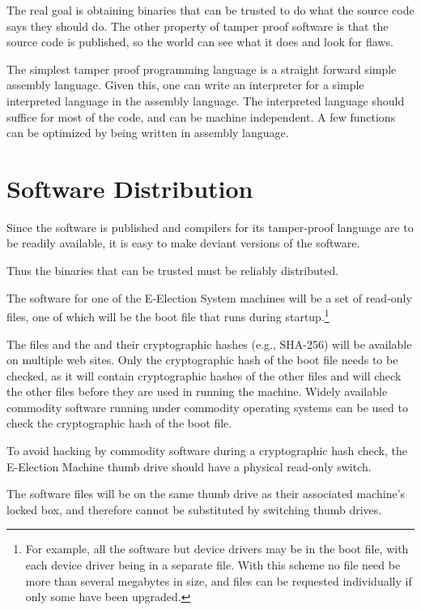 \documentclass[12pt]{article}
\begin{document}
The real goal is obtaining binaries that can be trusted to
do what the source code says they should do.  The other
property of tamper proof software is that the source code
is published, so the world can see what it does and look
for flaws.

The simplest tamper proof programming language is a straight
forward simple assembly language.  Given this, one can write
an interpreter for a simple interpreted language in the
assembly language.  The interpreted language should suffice
for most of the code, and can be machine independent.
A few functions can be optimized by being written in assembly
language.

\section{Software Distribution}\label{SOFTWARE-DISTRIBUTION}

Since the software is published and compilers for its tamper-proof
language are to be readily available, it is easy to make deviant
versions of the software.\label{DEVIANT-SOFTWARE}

Thus the binaries that can be trusted must be reliably distributed.

The software for one of the E-Election
System machines will be a set of read-only files, one of which will be
the boot file that runs during startup.\footnote{For example, all
the software but device drivers may be in the boot file, with each
device driver being in a separate file.  With this scheme no file
need be more than several megabytes in size, and files can be
requested individually if only some have been upgraded.}

The files and the
and their cryptographic hashes (e.g., SHA-256) will be available on multiple
web sites.  Only the cryptographic hash of the boot file needs to be checked,
as it will contain cryptographic hashes of the other files and will check
the other files before they are used in running the machine.
Widely available commodity software running under commodity operating systems
can be used to check the cryptographic hash of the boot file.

To avoid hacking by commodity software during a cryptographic hash check,
the E-Election Machine thumb drive should have a physical read-only
switch.

The software files will be on
the same thumb drive as their associated machine's locked box, and
therefore cannot be substituted by switching thumb drives.
\end{document}
